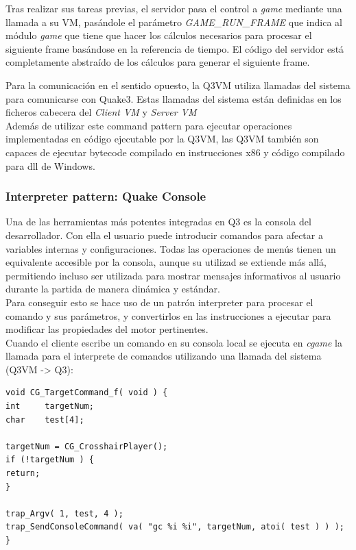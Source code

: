 \documentclass[a4paper,12pt]{report}
\begin{document}
	Tras realizar sus tareas previas, el servidor pasa el control a \textit{game} mediante una llamada a su VM, pasándole el parámetro \textit{GAME\_RUN\_FRAME} que indica al módulo \textit{game} que tiene que hacer los cálculos necesarios para procesar el siguiente frame basándose en la referencia de tiempo. El código del servidor está completamente abstraído de los cálculos para generar el siguiente frame.\\
	 \cite{q3vmcallex}

	Para la comunicación en el sentido opuesto, la Q3VM utiliza llamadas del sistema para comunicarse con Quake3. Estas llamadas del sistema están definidas en los ficheros cabecera del \textit{Client VM}\cite{q3vmclient} y \textit{Server VM}\cite{q3vmserver}\\
	
	
	Además de utilizar este command pattern para ejecutar operaciones implementadas en código ejecutable por la Q3VM, las Q3VM también son capaces de ejecutar bytecode compilado en instrucciones x86 y código compilado para dll de Windows. \cite{q3vmbb}
	
	
		\subsubsection{Interpreter pattern: Quake Console}
	Una de las herramientas más potentes integradas en Q3 es la consola del desarrollador. Con ella el usuario puede introducir comandos para afectar a variables internas y configuraciones. Todas las operaciones de menús tienen un equivalente accesible por la consola, aunque su utilizad se extiende más allá, permitiendo incluso ser utilizada para mostrar mensajes informativos al usuario durante la partida de manera dinámica y estándar.\\
	
	Para conseguir esto se hace uso de un patrón interpreter para procesar el comando y sus parámetros, y convertirlos en las instrucciones a ejecutar para modificar las propiedades del motor pertinentes.\cite{console_source}\cite{consolecmd_source}\\
	
	Cuando el cliente escribe un comando en su consola local se ejecuta en \textit{cgame} la llamada para el interprete de comandos utilizando una llamada del sistema (Q3VM -> Q3):\\
	
	\begin{lstlisting}[style=C, numbers=none]
void CG_TargetCommand_f( void ) {
int		targetNum;
char	test[4];

targetNum = CG_CrosshairPlayer();
if (!targetNum ) {
return;
}

trap_Argv( 1, test, 4 );
trap_SendConsoleCommand( va( "gc %i %i", targetNum, atoi( test ) ) );
}
	\end{lstlisting}
	
\end{document}
